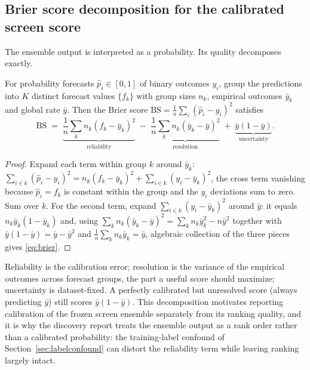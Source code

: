 \subsection{Brier score decomposition for the calibrated screen score}
The ensemble output is interpreted as a probability. Its quality
decomposes exactly.

\begin{proposition}\label{prop:brier}
For probability forecasts $\hat p_i \in [0,1]$ of binary outcomes $y_i$,
group the predictions into $K$ distinct forecast values
$\{f_k\}$ with group sizes $n_k$, empirical outcomes $\bar y_k$ and global
rate $\bar y$. Then the Brier score
$\mathrm{BS} = \frac1n \sum_i (\hat p_i - y_i)^2$ satisfies
\begin{equation}
\mathrm{BS} \;=\; \underbrace{\frac1n \sum_k n_k (f_k - \bar y_k)^2}_{\text{reliability}}
\;-\; \underbrace{\frac1n \sum_k n_k (\bar y_k - \bar y)^2}_{\text{resolution}}
\;+\; \underbrace{\bar y(1-\bar y)}_{\text{uncertainty}}.
\label{eq:brier}
\end{equation}
\end{proposition}
\begin{proof}
Expand each term within group $k$ around $\bar y_k$:
$\sum_{i \in k} (\hat p_i - y_i)^2 =
n_k(f_k - \bar y_k)^2 + \sum_{i \in k}(y_i - \bar y_k)^2$, the cross term
vanishing because $\hat p_i = f_k$ is constant within the group and the
$y_i$ deviations sum to zero. Sum over $k$. For the second term, expand
$\sum_{i \in k}(y_i - \bar y_k)^2$ around $\bar y$:
it equals $n_k \bar y_k(1-\bar y_k)$ and, using
$\sum_k n_k(\bar y_k - \bar y)^2 = \sum_k n_k \bar y_k^2 - n\bar y^2$
together with $\bar y(1-\bar y) = \bar y - \bar y^2$ and
$\frac1n\sum_k n_k \bar y_k = \bar y$, algebraic collection of the three
pieces gives \eqref{eq:brier}.
\end{proof}

\begin{remark}
Reliability is the calibration error; resolution is the variance of the
empirical outcomes across forecast groups, the part a useful score should
maximize; uncertainty is dataset-fixed. A perfectly calibrated but
unresolved score (always predicting $\bar y$) still scores $\bar y(1-\bar y)$.
This decomposition motivates reporting calibration of the frozen screen
ensemble separately from its ranking quality, and it is why the discovery
report treats the ensemble output as a rank order rather than a calibrated
probability: the training-label confound of Section~\ref{sec:labelconfound}
can distort the reliability term while leaving ranking largely intact.
\end{remark}
